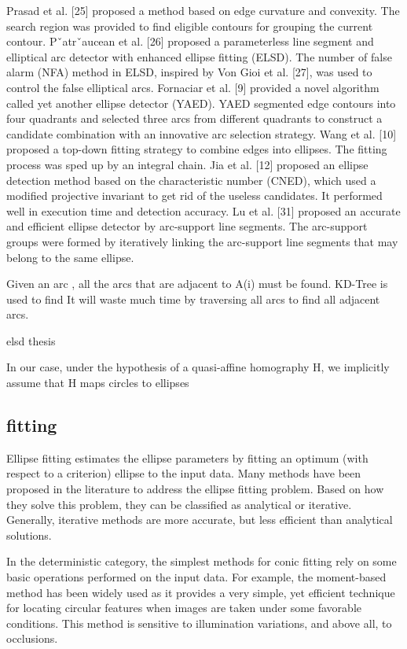 \documentclass[a4paper]{report}
\begin{document}
Prasad et al. [25] proposed a method
based on edge curvature and convexity. The search region was
provided to find eligible contours for grouping the current
contour. Pˇatrˇaucean et al. [26] proposed a parameterless line
segment and elliptical arc detector with enhanced ellipse fitting
(ELSD). The number of false alarm (NFA) method in ELSD,
inspired by Von Gioi et al. [27], was used to control the false
elliptical arcs. Fornaciar et al. [9] provided a novel algorithm
called yet another ellipse detector (YAED). YAED segmented
edge contours into four quadrants and selected three arcs
from different quadrants to construct a candidate combination
with an innovative arc selection strategy. Wang et al. [10]
proposed a top-down fitting strategy to combine edges into
ellipses. The fitting process was sped up by an integral
chain. Jia et al. [12] proposed an ellipse
detection method based on the characteristic number (CNED),
which used a modified projective invariant to get rid of the
useless candidates. It performed well in execution time and
detection accuracy. Lu et al. [31] proposed an accurate and efficient ellipse detector
by arc-support line segments. The arc-support groups were
formed by iteratively linking the arc-support line segments that
may belong to the same ellipse. 

Given an arc , all the arcs that are adjacent to A(i) must be found. KD-Tree is used to find
It will waste much
time by traversing all arcs to find all adjacent arcs.

elsd thesis


In our case, under the hypothesis of a
quasi-affine homography H, we implicitly assume that H maps circles to ellipses




\subsection{fitting}
Ellipse fitting estimates the ellipse parameters by fitting an optimum (with respect to a criterion) ellipse to the input data.
Many methods have been proposed in the literature to address the ellipse fitting problem. Based on how they solve this problem, they can be classified as analytical or iterative. Generally, iterative methods are more accurate, but less efficient than analytical solutions.





In the deterministic category, the simplest methods for conic fitting rely on some
basic operations performed on the input data. For example, the moment-based method has
been widely used as it provides a very simple, yet efficient technique for locating circular features
when images are taken under some favorable conditions.
This method is sensitive to illumination variations, and above all, to occlusions.
\end{document}
